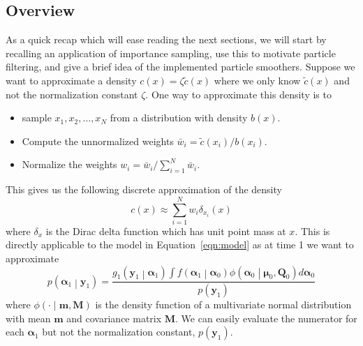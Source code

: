 \documentclass[notitlepage]{article}
\renewcommand{\vec}[1]{\bm{#1}}
\newcommand{\mat}[1]{\mathbf{#1}}
\newcommand{\Lparen}[1]{\left( #1\right)}
\newcommand{\Cond}[2]{ #1 \middle\vert  #2}
\newcommand{\optor}[2]{#1\Lparen{#2}}
\newcommand{\optorC}[3]{\optor{#1}{\Cond{#2}{#3}}}
\newcommand{\pdens}[1]{\optor{p}{#1}}
\newcommand{\pdensC}[2]{\optorC{p}{#1}{#2}}
\newcommand{\normaldC}[3]{\optorC{\phi}{#1}{#2,#3}}
\newcommand\dirac[2]{\optor{\delta_{#1}}{#2}}
\newcommand{\nPart}{N}
\begin{document}
\subsection{Overview}
As a quick recap which will ease reading the next sections, we will start by 
recalling an application of importance sampling, use this to motivate particle filtering, 
and give a brief idea of the implemented particle smoothers. 
Suppose we want to approximate a
density $c(x) = \zeta\tilde c(x)$ where we only know $\tilde c(x)$ and not 
the normalization constant $\zeta$. One way to approximate this density is 
to %
%
\begin{itemize}
  \item sample $x_1,x_2,\dots,x_\nPart$ from a distribution with density $b(x)$.
  \item Compute the unnormalized weights $\bar w_i = \tilde c(x_i) / b(x_i)$.
  \item Normalize the weights $w_i = \bar w_i / \sum_{i = 1}^\nPart\bar w_i$. 
\end{itemize}%
%
This gives us the following discrete approximation of the density %
%
$$c(x) \approx \sum_{i = 1}^\nPart w_i\dirac{x_i}{x}$$%
% 
where $\delta_{x}$ is the Dirac delta function which has unit point mass
at $x$. This is directly applicable to the model
in Equation~\eqref{eqn:model} as at time 1 we want to approximate %
%
$$
\pdensC{\vec\alpha_1}{\vec y_1} = \frac{
	\optorC{g_1}{\vec y_1}{\vec\alpha_1} 
	\int\optorC{f}{\vec\alpha_1}{\vec\alpha_0}
	\normaldC{\vec\alpha_0}{\vec\mu_0}{\mat Q_0}d\vec\alpha_0
	}{\pdens{\vec y_1}}
$$%
%
where $\normaldC{\cdot}{\vec m}{\mat M}$ is the density function of a multivariate normal 
distribution with mean $\vec m$ and covariance matrix $\mat M$. We can easily evaluate the 
numerator for each $\vec\alpha_1$ but not the normalization constant, $\pdens{\vec y_1}$. 
\end{document}
